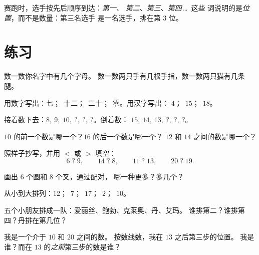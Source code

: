 \begin{example}[第一、第二、第三]\label{ex:g1:counting:ordinal}
赛跑时，选手按先后顺序到达：\emph{第一}、
\emph{第二}、\emph{第三}、\emph{第四}\,\dots\ 这些
词说明的是\emph{位置}，而不是数量：第三名选手
是一名选手，排在第 $3$ 位。
\end{example}

\section{练习}

\begin{exercise}[$\star$]\label{exo:g1:counting:1}
数一数你名字中有几个字母。
数一数两只手有几根手指，数一数两只猫有几条腿。
\end{exercise}

\begin{exercise}[$\star$]\label{exo:g1:counting:2}
用数字写出：七；\ 十二；\ 二十；\ 零。用汉字写出：
$4$；\ $15$；\ $18$。
\end{exercise}

\begin{exercise}[$\star$]\label{exo:g1:counting:3}
接着数下去：$8,\ 9,\ 10,\ ?,\ ?,\ ?$。倒着数：
$15,\ 14,\ 13,\ ?,\ ?,\ ?$。
\end{exercise}

\begin{exercise}[$\star$]\label{exo:g1:counting:4}
$10$ 的前一个数是哪一个？$16$ 的后一个数是哪一个？
$12$ 和 $14$ 之间的数是哪一个？
\end{exercise}

\begin{exercise}[$\star$]\label{exo:g1:counting:5}
照样子抄写，并用 $<$ 或 $>$ 填空：
\[
6 \;?\; 9, \qquad
14 \;?\; 8, \qquad
11 \;?\; 13, \qquad
20 \;?\; 19 .
\]
\end{exercise}

\begin{exercise}[$\star$]\label{exo:g1:counting:6}
画出 $6$ 个圆和 $8$ 个叉，通过配对，
哪一种更多？多几个？
\end{exercise}

\begin{exercise}[$\star$]\label{exo:g1:counting:7}
从小到大排列：$12$；\ $7$；\ $17$；\ $2$；\ $10$。
\end{exercise}

\begin{exercise}[$\star$]\label{exo:g1:counting:8}
五个小朋友排成一队：爱丽丝、鲍勃、克莱奥、丹、艾玛。
谁排第二？谁排第四？丹排在第几位？
\end{exercise}

\begin{exercise}[$\star\star$]\label{exo:g1:counting:9}
我是一个介于 $10$ 和 $20$ 之间的数。
按数线数，我在 $13$ 之后第三步的位置。
我是谁？而在 $13$ 的\emph{之前}第三步的数是谁？
\end{exercise}

